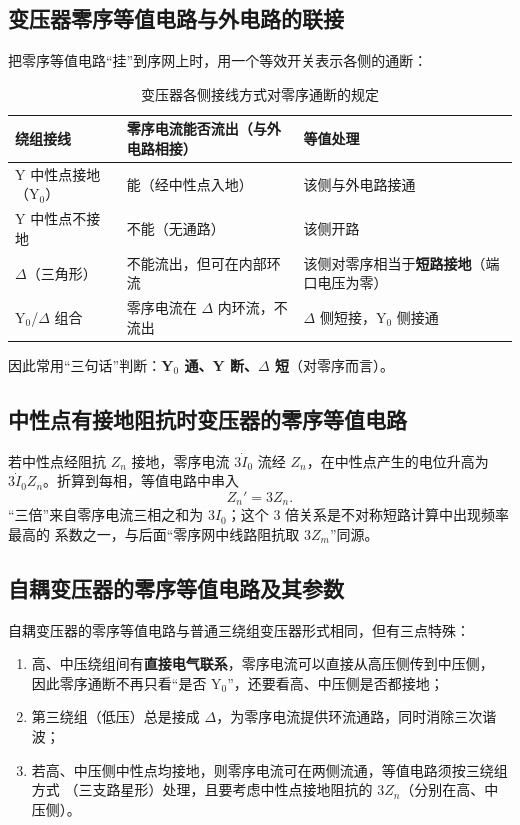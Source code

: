 \subsection{变压器零序等值电路与外电路的联接}

把零序等值电路“挂”到序网上时，用一个等效开关表示各侧的通断：

\begin{table}[htbp]
  \centering
  \caption{变压器各侧接线方式对零序通断的规定}
  \small
  \begin{tabular}{@{}lll@{}}
    \toprule
    绕组接线 & 零序电流能否流出（与外电路相接） & 等值处理 \\
    \midrule
    Y 中性点接地（Y$_0$） & 能（经中性点入地） & 该侧与外电路接通 \\
    Y 中性点不接地 & 不能（无通路） & 该侧开路 \\
    $\Delta$（三角形） & 不能流出，但可在内部环流 & 该侧对零序相当于\textbf{短路接地}（端口电压为零） \\
    Y$_0$/$\Delta$ 组合 & 零序电流在 $\Delta$ 内环流，不流出 & $\Delta$ 侧短接，Y$_0$ 侧接通 \\
    \bottomrule
  \end{tabular}
\end{table}

因此常用“三句话”判断：\textbf{Y$_0$ 通、Y 断、$\Delta$ 短}（对零序而言）。

\subsection{中性点有接地阻抗时变压器的零序等值电路}

若中性点经阻抗 $Z_n$ 接地，零序电流 $3\dot I_0$ 流经 $Z_n$，在中性点产生的电位升高为
$3\dot I_0Z_n$。折算到每相，等值电路中串入
\begin{equation}
  Z_n'=3Z_n .
\end{equation}
“三倍”来自零序电流三相之和为 $3I_0$；这个 $3$ 倍关系是不对称短路计算中出现频率最高的
系数之一，与后面“零序网中线路阻抗取 $3Z_m$”同源。

\subsection{自耦变压器的零序等值电路及其参数}

自耦变压器的零序等值电路与普通三绕组变压器形式相同，但有三点特殊：
\begin{enumerate}
  \item 高、中压绕组间有\textbf{直接电气联系}，零序电流可以直接从高压侧传到中压侧，
        因此零序通断不再只看“是否 Y$_0$”，还要看高、中压侧是否都接地；
  \item 第三绕组（低压）总是接成 $\Delta$，为零序电流提供环流通路，同时消除三次谐波；
  \item 若高、中压侧中性点均接地，则零序电流可在两侧流通，等值电路须按三绕组方式
        （三支路星形）处理，且要考虑中性点接地阻抗的 $3Z_n$（分别在高、中压侧）。
\end{enumerate}


